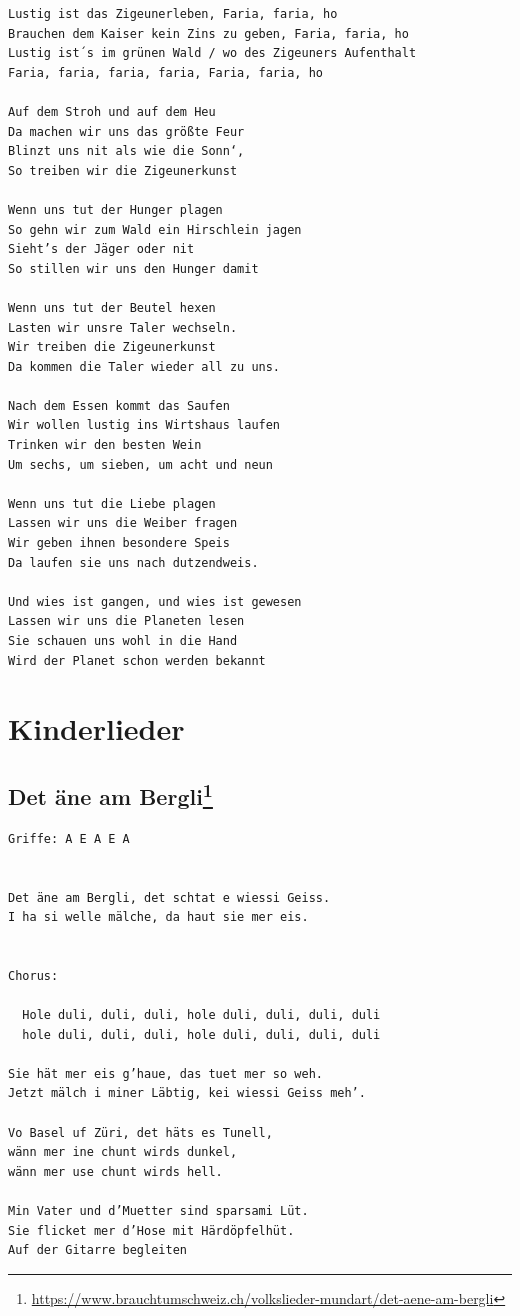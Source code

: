 \documentclass[
]{book}
\let\stdsection\section
\renewcommand\section{\clearpage\stdsection}
\begin{document}
\begin{verbatim}
Lustig ist das Zigeunerleben, Faria, faria, ho
Brauchen dem Kaiser kein Zins zu geben, Faria, faria, ho
Lustig ist´s im grünen Wald / wo des Zigeuners Aufenthalt
Faria, faria, faria, faria, Faria, faria, ho

Auf dem Stroh und auf dem Heu
Da machen wir uns das größte Feur
Blinzt uns nit als wie die Sonn‘,
So treiben wir die Zigeunerkunst

Wenn uns tut der Hunger plagen
So gehn wir zum Wald ein Hirschlein jagen
Sieht’s der Jäger oder nit
So stillen wir uns den Hunger damit

Wenn uns tut der Beutel hexen
Lasten wir unsre Taler wechseln.
Wir treiben die Zigeunerkunst
Da kommen die Taler wieder all zu uns.

Nach dem Essen kommt das Saufen
Wir wollen lustig ins Wirtshaus laufen
Trinken wir den besten Wein
Um sechs, um sieben, um acht und neun

Wenn uns tut die Liebe plagen
Lassen wir uns die Weiber fragen
Wir geben ihnen besondere Speis
Da laufen sie uns nach dutzendweis.

Und wies ist gangen, und wies ist gewesen
Lassen wir uns die Planeten lesen
Sie schauen uns wohl in die Hand
Wird der Planet schon werden bekannt
\end{verbatim}

\hypertarget{kinderlieder}{%
\chapter{Kinderlieder}\label{kinderlieder}}

\hypertarget{kinderlieder-det-aenet-am-bergli}{%
\section[Det äne am Bergli]{\texorpdfstring{Det äne am Bergli\footnote{\url{https://www.brauchtumschweiz.ch/volkslieder-mundart/det-aene-am-bergli}}}{Det äne am Bergli}}\label{kinderlieder-det-aenet-am-bergli}}

\begin{verbatim}
Griffe: A E A E A


Det äne am Bergli, det schtat e wiessi Geiss.
I ha si welle mälche, da haut sie mer eis.


Chorus:
  
  Hole duli, duli, duli, hole duli, duli, duli, duli
  hole duli, duli, duli, hole duli, duli, duli, duli

Sie hät mer eis g’haue, das tuet mer so weh.
Jetzt mälch i miner Läbtig, kei wiessi Geiss meh’.

Vo Basel uf Züri, det häts es Tunell,
wänn mer ine chunt wirds dunkel,
wänn mer use chunt wirds hell.

Min Vater und d’Muetter sind sparsami Lüt.
Sie flicket mer d’Hose mit Härdöpfelhüt.
Auf der Gitarre begleiten
\end{verbatim}
\end{document}
